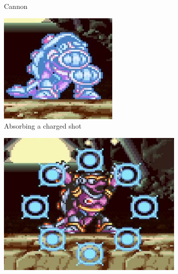 \begin{figure}[htp]
\begin{subfigure}[t]{0.4\textwidth}
		\caption{Cannon}
	\end{subfigure}	
	\begin{subfigure}{0.35\textwidth}
		\centering
		\includegraphics[width=\linewidth]{figures/X1/Armored_armadillo/Armadillo_energy_1.jpg}
		\caption{Absorbing a charged shot}
	\end{subfigure}
	\begin{subfigure}{0.42\textwidth}
		\centering
		\includegraphics[width=\linewidth]{figures/X1/Armored_armadillo/Armadillo_energy_2.jpg}

\end{subfigure}
\end{figure}
